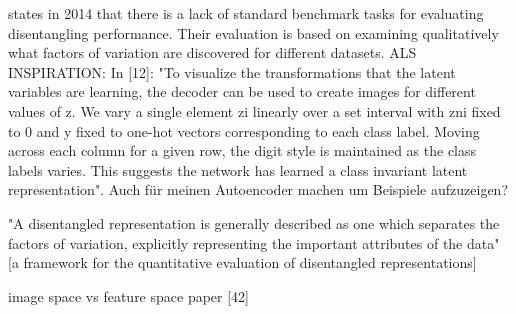 \documentclass[11pt,a4paper]{article}
\begin{document}
\par\cite{1412.6583} states in 2014 that there is a lack of standard benchmark tasks for evaluating disentangling performance. Their evaluation is based on examining qualitatively what factors of variation are discovered for different datasets. ALS INSPIRATION: In [12]: "To visualize the transformations that the latent variables are learning, the decoder can be used to create images for different values of z. We vary a single element zi linearly over a set interval with zni fixed to 0 and y fixed to one-hot vectors corresponding to each class label. Moving across each column for a given row, the digit style is maintained as the class labels varies. This suggests the network has learned a class invariant latent representation". Auch für meinen Autoencoder machen um Beispiele aufzuzeigen?

\par "A disentangled representation is generally described as one which separates the factors of variation, explicitly representing the important attributes of the data" [a framework for the quantitative evaluation of disentangled representations]

\par image space vs feature space paper [42]
\end{document}
